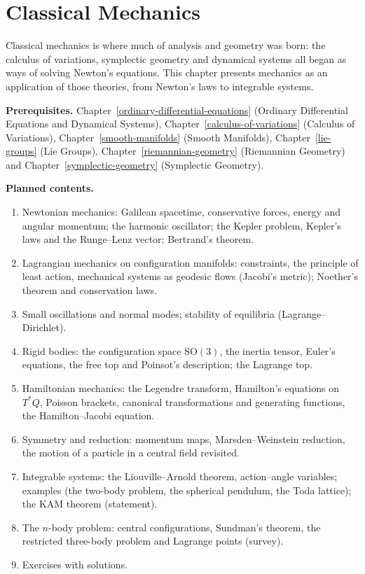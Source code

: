 \chapter{Classical Mechanics}\label{classical-mechanics}

Classical mechanics is where much of analysis and geometry was born: the calculus of variations,
symplectic geometry and dynamical systems all began as ways of solving Newton's equations. This chapter
presents mechanics as an application of those theories, from Newton's laws to integrable systems.

\noindent\textbf{Prerequisites.} Chapter~\ref{ordinary-differential-equations} (Ordinary Differential Equations and Dynamical Systems), Chapter~\ref{calculus-of-variations} (Calculus of Variations), Chapter~\ref{smooth-manifolds} (Smooth Manifolds), Chapter~\ref{lie-groups} (Lie Groups), Chapter~\ref{riemannian-geometry} (Riemannian Geometry) and Chapter~\ref{symplectic-geometry} (Symplectic Geometry).

\noindent\textbf{Planned contents.}
\begin{enumerate}
\item Newtonian mechanics: Galilean spacetime, conservative forces, energy and angular momentum; the
harmonic oscillator; the Kepler problem, Kepler's laws and the Runge--Lenz vector; Bertrand's theorem.
\item Lagrangian mechanics on configuration manifolds: constraints, the principle of least action,
mechanical systems as geodesic flows (Jacobi's metric); Noether's theorem and conservation laws.
\item Small oscillations and normal modes; stability of equilibria (Lagrange--Dirichlet).
\item Rigid bodies: the configuration space $\mathrm{SO}(3)$, the inertia tensor, Euler's equations, the
free top and Poinsot's description; the Lagrange top.
\item Hamiltonian mechanics: the Legendre transform, Hamilton's equations on $T^*Q$, Poisson brackets,
canonical transformations and generating functions, the Hamilton--Jacobi equation.
\item Symmetry and reduction: momentum maps, Marsden--Weinstein reduction, the motion of a particle in a
central field revisited.
\item Integrable systems: the Liouville--Arnold theorem, action--angle variables; examples (the
two-body problem, the spherical pendulum, the Toda lattice); the KAM theorem (statement).
\item The $n$-body problem: central configurations, Sundman's theorem, the restricted three-body problem
and Lagrange points (survey).
\item Exercises with solutions.
\end{enumerate}
